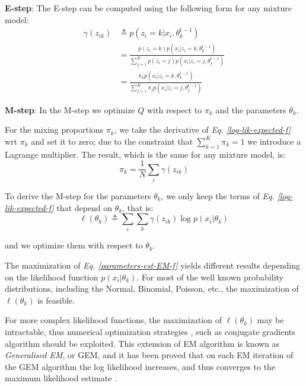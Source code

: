 \noindent
\textbf{E-step}: The E-step can be computed using the following form for any mixture model:
\begin{equation} \label{responsibilities-f}
  \begin{split}
	\gamma(z_{ik}) & \triangleq p(z_{i}=k|x_{i},\theta_{k}^{t-1}) \\
				   & = \frac{p(z_{i}=k)p(x_{i}|z_{i}=k,\theta_{k}^{t-1})}{\sum\limits_{j=1}^{K} p(z_{i}=j)p(x_{i}|z_{i}=j,\theta_{j}^{t-1})} \\
				   & = \frac{\pi_{k}p(x_{i}|z_{i}=k,\theta_{k}^{t-1})}{\sum\limits_{j=1}^{K} \pi_{j}p(x_{i}|z_{i}=j,\theta_{j}^{t-1})}
  \end{split}
\end{equation}

\noindent
\textbf{M-step}: In the M-step we optimize $Q$ with respect to $\pi_{k}$ and the parameters $\theta_{k}$.

For the mixing proportions $\pi_{k}$, we take the derivative of \emph{Eq. \ref{log-lik-expected-f}} wrt $\pi_{k}$ and set it to zero; due to the constraint that $\sum_{k=1}^{K}\pi_{k} = 1$ we introduce a Lagrange multiplier. The result, which is the same for any mixture model, is:
\begin{equation} \label{mixing-proportions-est-f}
		\pi_{k} = \frac{1}{N} \sum_{i} \gamma(z_{ik})
\end{equation}

To derive the M-step for the parameters $\theta_{k}$, we only keep the terms of \emph{Eq. \ref{log-lik-expected-f}} that depend on $\theta_{k}$, that is:
\begin{equation} \label{parameters-est-EM-f}
		\ell(\theta_{k}) \triangleq \sum_{i} \sum_{k} \gamma(z_{ik}) \log p(x_{i}|\theta_{k})
\end{equation}

and we optimize them with respect to $\theta_{k}$.

The maximization of \emph{Eq. \ref{parameters-est-EM-f}} yields different results depending on the likelihood function $p(x_{i}|\theta_{k})$. For most of the well known probability distributions, including the Normal, Binomial, Poisson, etc., the maximization of $\ell(\theta_{k})$ is feasible. 

For more complex likelihood functions, the maximization of $\ell(\theta_{k})$ may be intractable, thus numerical optimization strategies \citep{Nocedal2006}, such as conjugate gradients algorithm \citep{Hestenes1952} should be exploited. This extension of EM algorithm is known as \emph{Generalised EM}, or GEM, and it has been proved that on each EM iteration of the GEM algorithm the log likelihood increases, and thus converges to the maximum likelihood estimate \citep{Wu1983}.

